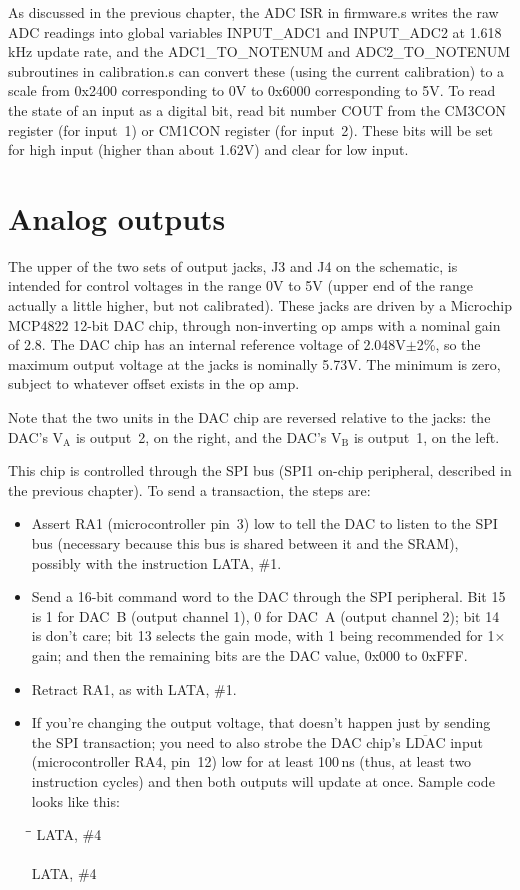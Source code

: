 As discussed in the previous chapter, the ADC ISR in firmware.s writes the
raw ADC readings into global variables INPUT\_ADC1 and INPUT\_ADC2 at
1.618\,kHz update rate, and the ADC1\_TO\_NOTENUM and ADC2\_TO\_NOTENUM
subroutines in calibration.s can convert these (using the current
calibration) to a scale from 0x2400 corresponding to 0V to 0x6000
corresponding to 5V.  To read the state of an input as a digital bit, read
bit number COUT from the CM3CON register (for input~1) or CM1CON register
(for input~2).  These bits will be set for high input (higher than about
1.62V) and clear for low input.

\section{Analog outputs}

The upper of the two sets of output jacks, J3 and J4 on the schematic,
is intended for control voltages in the range 0V to 5V (upper end of the
range actually a little higher, but not calibrated).  These jacks are driven
by a Microchip MCP4822 12-bit DAC chip, through non-inverting op amps with a
nominal gain of 2.8.  The DAC chip has an internal reference voltage of
2.048V$\pm$2\%, so the maximum output voltage at the jacks is nominally
5.73V.  The minimum is zero, subject to whatever offset exists in the op
amp.

Note that the two units in the DAC chip are reversed relative to the jacks:
the DAC's V$_\textrm{A}$ is output~2, on the right, and the DAC's
V$_\textrm{B}$ is output~1, on the left.

This chip is controlled through the SPI bus (SPI1 on-chip peripheral,
described in the previous chapter).  To send a transaction, the steps are:
\begin{itemize}
  \item Assert RA1 (microcontroller pin~3) low to tell the DAC to listen to
    the SPI bus (necessary because this bus is shared between it and the
    SRAM), possibly with the instruction  LATA, \#1.
  \item Send a 16-bit command word to the DAC through the SPI peripheral. 
    Bit 15 is 1 for DAC~B (output channel 1), 0 for DAC~A (output channel 2);
    bit 14 is don't care; bit 13 selects the gain mode, with 1 being
    recommended for 1$\times$ gain; and then the remaining bits are the DAC
    value, 0x000 to 0xFFF.
  \item Retract RA1, as with  LATA, \#1.
  \item If you're changing the output voltage, that doesn't happen just by
    sending the SPI transaction; you need to also strobe the DAC chip's
    $\overline{\textrm{LDAC}}$ input (microcontroller RA4, pin~12) low for
    at least 100\,ns (thus, at least two instruction cycles) and then both
    outputs will update at once.  Sample code looks like this:
\begin{tabbing}
\qquad\=\qquad\qquad\=\kill
\>\>LATA, \#4\\
\>\\
\>\>LATA, \#4\\
\end{tabbing}
\end{itemize}

